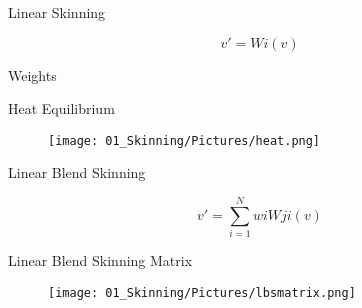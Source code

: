 	\begin{frame}{\Huge{Linear Skinning}}
		
		$$v'=Wi(v)$$
		
		
	\end{frame}

{ %
	\begin{frame}{\Huge{Weights}}
		
		
		
		
	\end{frame}
} %

	\begin{frame}{\Huge{Heat Equilibrium}}
		
		\begin{figure}
			\texttt{[image: 01\_Skinning/Pictures/heat.png]}
		\end{figure}
		
		
		
	\end{frame}
	
	\begin{frame}{\Huge{Linear Blend Skinning}}
		
		$$v'=\sum_{i=1}^{N}wiWji(v)$$
		
		
	\end{frame}
	
		\begin{frame}{\Huge{Linear Blend Skinning Matrix}}
			
			\begin{figure}
				\texttt{[image: 01\_Skinning/Pictures/lbsmatrix.png]}
			\end{figure}
			
			
			
		\end{frame}
		
